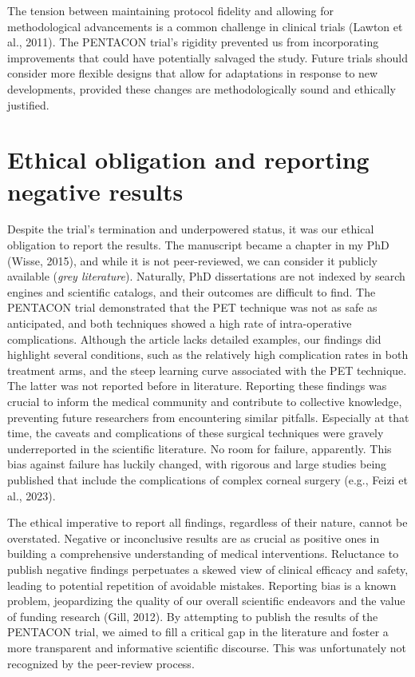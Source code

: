 \documentclass[authordate, reflection]{jote-new-article}
\begin{document}
	The tension between maintaining protocol fidelity and allowing for methodological advancements is a common challenge in clinical trials (Lawton et al., 2011). The PENTACON trial's rigidity prevented us from incorporating improvements that could have potentially salvaged the study. Future trials should consider more flexible designs that allow for adaptations in response to new developments, provided these changes are methodologically sound and ethically justified.



	\section{Ethical obligation and reporting negative results}



	Despite the trial's termination and underpowered status, it was our ethical obligation to report the results. The manuscript became a chapter in my PhD (Wisse, 2015), and while it is not peer-reviewed, we can consider it publicly available (\emph{grey literature}). Naturally, PhD dissertations are not indexed by search engines and scientific catalogs, and their outcomes are difficult to find. The PENTACON trial demonstrated that the PET technique was not as safe as anticipated, and both techniques showed a high rate of intra-operative complications. Although the article lacks detailed examples, our findings did highlight several conditions, such as the relatively high complication rates in both treatment arms, and the steep learning curve associated with the PET technique. The latter was not reported before in literature. Reporting these findings was crucial to inform the medical community and contribute to collective knowledge, preventing future researchers from encountering similar pitfalls. Especially at that time, the caveats and complications of these surgical techniques were gravely underreported in the scientific literature. No room for failure, apparently. This bias against failure has luckily changed, with rigorous and large studies being published that include the complications of complex corneal surgery (e.g., Feizi et al., 2023).



	The ethical imperative to report all findings, regardless of their nature, cannot be overstated. Negative or inconclusive results are as crucial as positive ones in building a comprehensive understanding of medical interventions. Reluctance to publish negative findings perpetuates a skewed view of clinical efficacy and safety, leading to potential repetition of avoidable mistakes. Reporting bias is a known problem, jeopardizing the quality of our overall scientific endeavors and the value of funding research (Gill, 2012). By attempting to publish the results of the PENTACON trial, we aimed to fill a critical gap in the literature and foster a more transparent and informative scientific discourse. This was unfortunately not recognized by the peer-review process.
\end{document}
